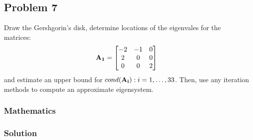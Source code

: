 \subsection{Problem 7}%
\label{sec:problem_7}

Draw the Gershgorin's disk, determine locations of the eigenvales for the matrices:
\begin{equation*}
    \mathbf{A_1} = 
    \begin{bmatrix}
        -2 & -1 &  0\\
         2 &  0 &  0\\
         0 &  0 &  2 
    \end{bmatrix}
\end{equation*}
and estimate an upper bound for $cond(\mathbf{A_i}) : i = 1, \ldots, 3 3$.
Then, use any iteration methods to compute an approximate eigensystem.

\subsubsection*{Mathematics}



\subsubsection*{Solution}

